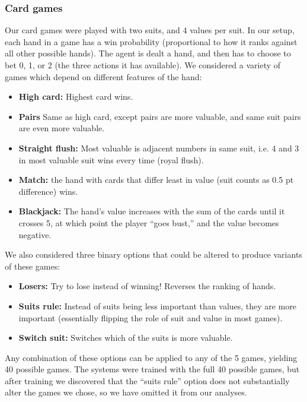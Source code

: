 \documentclass{article}
\begin{document}
\subsubsection{Card games}
\label{meth_data_cards}
Our card games were played with two suits, and 4 values per suit. In our setup, each hand in a game has a win probability (proportional to how it ranks against all other possible hands). The agent is dealt a hand, and then has to choose to bet 0, 1, or 2 (the three actions it has available). We considered a variety of games which depend on different features of the hand: 
\begin{itemize}
\item \textbf{High card:} Highest card wins.
\item \textbf{Pairs} Same as high card, except pairs are more valuable, and same suit pairs are even more valuable.
\item \textbf{Straight flush:} Most valuable is adjacent numbers in same suit, i.e. 4 and 3 in most valuable suit wins every time (royal flush).
\item \textbf{Match:} the hand with cards that differ least in value (suit counts as 0.5 pt difference) wins.
\item \textbf{Blackjack:} The hand's value increases with the sum of the cards until it crosses 5, at which point the player ``goes bust,'' and the value becomes negative. 
\end{itemize}
We also considered three binary options that could be altered to produce variants of these games:
\begin{itemize}
\item \textbf{Losers:} Try to lose instead of winning! Reverses the ranking of hands.
\item \textbf{Suits rule:} Instead of suits being less important than values, they are more important (essentially flipping the role of suit and value in most games).
\item \textbf{Switch suit:} Switches which of the suits is more valuable.
\end{itemize}
Any combination of these options can be applied to any of the 5 games, yielding 40 possible games. The systems were trained with the full 40 possible games, but after training we discovered that the ``suits rule'' option does not substantially alter the games we chose, so we have omitted it from our analyses.\par
\end{document}
